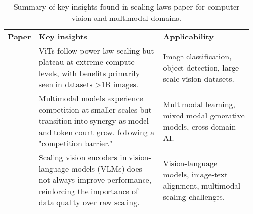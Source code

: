 \begin{table*}[!tb]
    \centering
    \begin{tabular}{p{3.5cm} p{5.2cm} p{5.2cm}}
        \cline{1-3}
        \textbf{Paper} & \textbf{Key insights} & \textbf{Applicability} \\
        \cline{1-3}
        \citet{zhai_scaling_2022} & ViTs follow power-law scaling but plateau at extreme compute levels, with benefits primarily seen in datasets >1B images. & Image classification, object detection, large-scale vision datasets. \\
        \cline{1-3}
        \citet{aghajanyan_scaling_2023} & Multimodal models experience competition at smaller scales but transition into synergy as model and token count grow, following a "competition barrier." & Multimodal learning, mixed-modal generative models, cross-domain AI. \\
        \cline{1-3}
        \citet{li_are_2024} & Scaling vision encoders in vision-language models (VLMs) does not always improve performance, reinforcing the importance of data quality over raw scaling. & Vision-language models, image-text alignment, multimodal scaling challenges. \\
        \cline{1-3}
    \end{tabular}
    \caption{Summary of key insights found in scaling laws paper for computer vision and multimodal domains.}
    \label{tab:scaling_laws2}
\end{table*}
